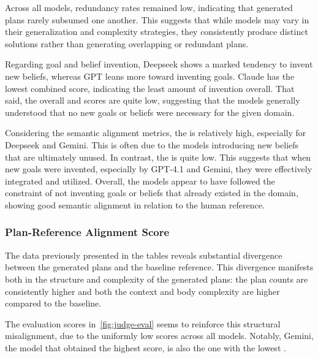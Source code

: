 \documentclass[12pt,a4paper,openright,twoside]{book}
\begin{document}
Across all models, redundancy rates remained low, indicating that generated plans rarely subsumed one another.
%
This suggests that while models may vary in their generalization and complexity strategies, they consistently produce distinct solutions rather than generating overlapping or redundant plans.

Regarding goal and belief invention, Deepseek shows a marked tendency to invent new beliefs, whereas GPT leans more toward inventing goals.
%
Claude has the lowest combined score, indicating the least amount of invention overall.
%
That said, the overall \NGC{} and \NBC{} scores are quite low, suggesting that the models generally understood that no new goals or beliefs were necessary for the given domain.

Considering the semantic alignment metrics, the \BSA{} is relatively high, especially for Deepseek and Gemini.
%
This is often due to the models introducing new beliefs that are ultimately unused.
%
In contrast, the \GSA{} is quite low.
%
This suggests that when new goals were invented, especially by GPT-4.1 and Gemini, they were effectively integrated and utilized.
%
Overall, the models appear to have followed the constraint of not inventing goals or beliefs that already existed in the domain, showing good semantic alignment in relation to the human reference.

\subsubsection{Plan-Reference Alignment Score}

The data previously presented in the tables reveals substantial divergence between the generated plans and the baseline reference. 
%
This divergence manifests both in the structure and complexity of the generated plans: the plan counts are consistently higher and both the context and body complexity are higher compared to the baseline.

The \PRAS{} evaluation scores in~\cref{fig:judge-eval} seems to reinforce this structural misalignment, due to the uniformly low scores across all models.
%
Notably, Gemini, the model that obtained the highest \PRAS{} score, is also the one with the lowest \TSR{}.
\end{document}
